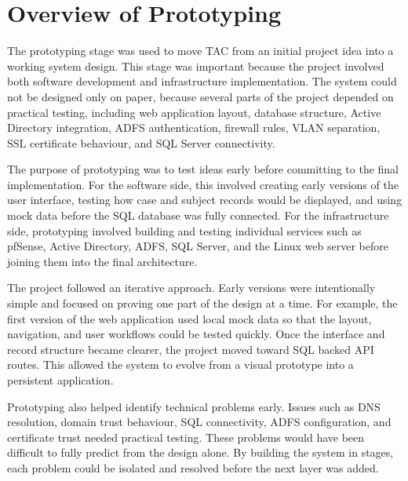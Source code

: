 
\raggedright

\section{Overview of Prototyping}

The prototyping stage was used to move TAC from an initial project idea into a working system design. This stage was important because the project involved both software development and infrastructure implementation. The system could not be designed only on paper, because several parts of the project depended on practical testing, including web application layout, database structure, Active Directory integration, ADFS authentication, firewall rules, VLAN separation, SSL certificate behaviour, and SQL Server connectivity.

The purpose of prototyping was to test ideas early before committing to the final implementation. For the software side, this involved creating early versions of the user interface, testing how case and subject records would be displayed, and using mock data before the SQL database was fully connected. For the infrastructure side, prototyping involved building and testing individual services such as pfSense, Active Directory, ADFS, SQL Server, and the Linux web server before joining them into the final architecture.

The project followed an iterative approach. Early versions were intentionally simple and focused on proving one part of the design at a time. For example, the first version of the web application used local mock data so that the layout, navigation, and user workflows could be tested quickly. Once the interface and record structure became clearer, the project moved toward SQL backed API routes. This allowed the system to evolve from a visual prototype into a persistent application.

Prototyping also helped identify technical problems early. Issues such as DNS resolution, domain trust behaviour, SQL connectivity, ADFS configuration, and certificate trust needed practical testing. These problems would have been difficult to fully predict from the design alone. By building the system in stages, each problem could be isolated and resolved before the next layer was added.


